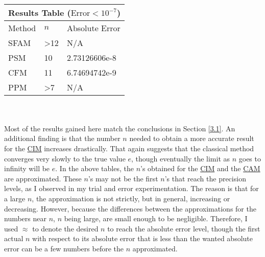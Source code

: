 \documentclass[11pt]{article}
\begin{document}
\,
\begin{tabular}{ |p{1.3cm}|p{2.2cm}|p{2.7cm}|  }
\hline
\multicolumn{3}{|c|}{Results Table ($\textrm{Error}<10^{-7}$)} \\
\hline
Method & $n$ & Absolute Error \\ 
\hline\hline
SFAM   & >12 & N/A \\
\hline
PSM    & 10  & 2.73126606e-8 \\
\hline
CFM    & 11  & 6.74694742e-9 \\
\hline
PPM    & >7  & N/A \\
\hline
\end{tabular}
\\\\
Most of the results gained here match the conclusions in Section \ref{3.1}. An additional finding is that the number $n$ needed to obtain a more accurate result for the \hyperref[2.1]{CIM} increases drastically. That again suggests that the classical method converges very slowly to the true value $e$, though eventually the limit as $n$ goes to infinity will be $e$. In the above tables, the $n$'s obtained for the \hyperref[2.1]{CIM} and the \hyperref[2.3]{CAM} are approximated. These $n$'s may not be the first $n$'s that reach the precision levels, as I observed in my trial and error experimentation. The reason is that for a large $n$, the approximation is not strictly, but in general, increasing or decreasing. However, because the differences between the approximations for the numbers near $n$, $n$ being large, are small enough to be negligible. Therefore, I used $\approx$ to denote the desired $n$ to reach the absolute error level, though the first actual $n$ with respect to its absolute error that is less than the wanted absolute error can be a few numbers before the $n$ approximated.



\end{document}

